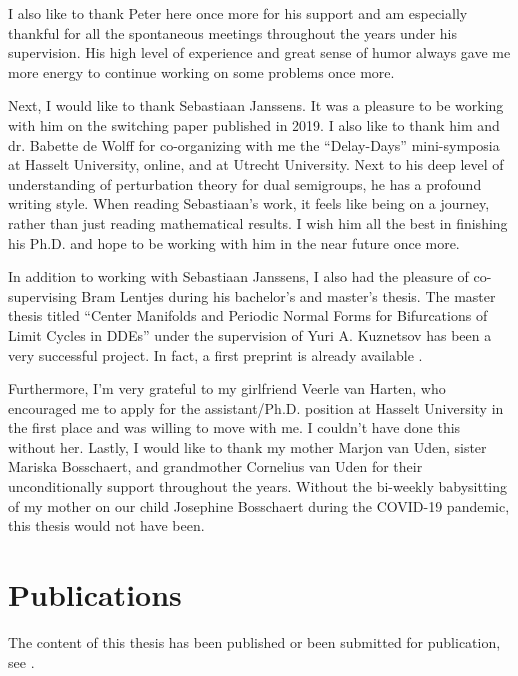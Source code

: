 I also like to thank Peter here once more for his support and am especially
thankful for all the spontaneous meetings throughout the years under his
supervision. His high level of experience and great sense of humor always gave me
more energy to continue working on some problems once more.

Next, I would like to thank Sebastiaan Janssens. It was a pleasure to be working
with him on the switching paper published in 2019. I also like to thank him and
dr. Babette de Wolff for co-organizing with me the ``Delay-Days'' mini-symposia
at Hasselt University, online, and at Utrecht University. Next to his deep level
of understanding of perturbation theory for dual semigroups, he has a profound
writing style. When reading Sebastiaan's work, it feels like being on a journey,
rather than just reading mathematical results. I wish him all the best in
finishing his Ph.D. and hope to be working with him in the near future once
more.

In addition to working with Sebastiaan Janssens, I also had the pleasure of
co-supervising Bram Lentjes during his bachelor's and master's thesis. The
master thesis titled ``Center Manifolds and Periodic Normal Forms for
Bifurcations of Limit Cycles in DDEs'' under the supervision of Yuri A.
Kuznetsov has been a very successful project. In fact, a first preprint is
already available \cite{Bram@2022}.

Furthermore, I'm very grateful to my girlfriend Veerle van Harten, who encouraged
me to apply for the assistant/Ph.D. position at Hasselt University in the first
place and was willing to move with me. I couldn't have done this without her.
Lastly, I would like to thank my mother Marjon van Uden, sister Mariska
Bosschaert, and grandmother Cornelius van Uden for their unconditionally support
throughout the years. Without the bi-weekly babysitting of my mother on our
child Josephine Bosschaert during the COVID-19 pandemic, this thesis would not
have been.


\section{Publications}
The content of this thesis has been published or been submitted for publication,
see \cite{Bosschaert@Interplay,Switching2019,PhysRevD.105.065021}.
